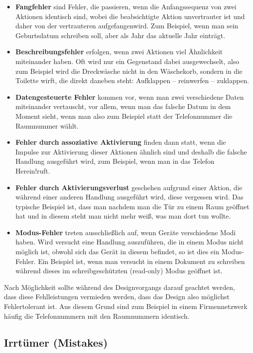 \documentclass[parskip,headsepline, headtopline, %
footsepline, oneside, 12pt, headings=small]{scrreprt}
\begin{document}
\begin{itemize}
\item \textbf{Fangfehler} sind Fehler, die passieren, wenn die Anfangssequenz von zwei Aktionen identisch sind, wobei die beabsichtigte Aktion unvertrauter ist und daher von der vertrauteren \glqq aufgefangen\grqq wird. Zum Beispiel, wenn man sein Geburtsdatum schreiben soll, aber als Jahr das aktuelle Jahr einträgt.
\item \textbf{Beschreibungsfehler} erfolgen, wenn zwei Aktionen viel Ähnlichkeit miteinander haben. Oft wird nur ein Gegenstand dabei ausgewechselt, also zum Beispiel wird die Dreckwäsche nicht in den Wäschekorb, sondern in die Toilette wirft, die direkt daneben steht: Aufklappen -- reinwerfen -- zuklappen.
\item \textbf{Datengesteuerte Fehler} kommen vor, wenn man zwei verschiedene Daten miteinander vertauscht, vor allem, wenn man das falsche Datum in dem Moment sieht, wenn man also zum Beispiel statt der Telefonnummer die Raumnummer wählt.
\item \textbf{Fehler durch assoziative Aktivierung} finden dann statt, wenn die Impulse zur Aktivierung dieser Aktionen ähnlich sind und deshalb die falsche Handlung ausgeführt wird, zum Beispiel, wenn man in das Telefon \glqq Herein!\grqq  ruft.
\item \textbf{Fehler durch Aktivierungsverlust} geschehen aufgrund einer Aktion, die während einer anderen Handlung ausgeführt wird, diese vergessen wird. Das typische Beispiel ist, dass man nachdem man die Tür zu einem Raum geöffnet hat und in diesem steht man nicht mehr weiß, was man dort tun wollte.
\item \textbf{Modus-Fehler} treten ausschließlich auf, wenn Geräte verschiedene Modi haben. Wird versucht eine Handlung auszuführen, die in einem Modus nicht möglich ist, obwohl sich das Gerät in diesem befindet, so ist dies ein Modus-Fehler. Ein Beispiel ist, wenn man versucht in einem Dokument zu schreiben während dieses im schreibgeschützten (read-only) Modus geöffnet ist.
\end{itemize}

Nach Möglichkeit sollte während des Designvorgangs darauf geachtet werden, dass diese Fehlleistungen vermieden werden, dass das Design also möglichst Fehlertolerant ist. Aus diesem Grund sind zum Beispiel in einem Firmennetzwerk häufig die Telefonnummern mit den Raumnummern identisch.

\subsection{Irrtümer (Mistakes)}
\end{document}
